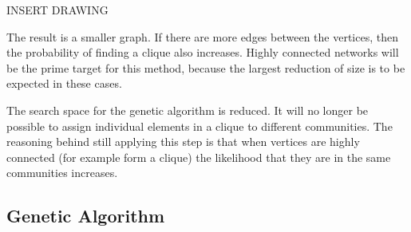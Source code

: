 INSERT DRAWING 

The result is a smaller graph.
If there are more edges between the vertices, then the probability of finding a clique also increases.
Highly connected networks will be the prime target for this method, because the largest reduction of size is to be expected in these cases.

The search space for the genetic algorithm is reduced. 
It will no longer be possible to assign individual elements in a clique to different communities.
The reasoning behind still applying this step is that when vertices are highly connected (for example form a clique) the likelihood that they are in the same communities increases. 

\subsection{Genetic Algorithm}